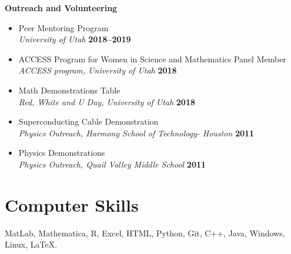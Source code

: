 \documentclass[margin,line]{res}
\begin{document}
\begin{resume}
{\bf Outreach and Volunteering}
\begin{itemize}
    \item[ ] Peer Mentoring Program
    \\ {\it University of Utah} \hfill {\bf 2018--2019}
    \item[ ] ACCESS Program for Women in Science and Mathematics Panel Member 
    \\ {\it ACCESS program, University of Utah} \hfill {\bf 2018}
    \item[ ] Math Demonstrations Table
    \\ {\it Red, White and U Day, University of Utah} \hfill {\bf 2018}
    \item[ ] Superconducting Cable Demonstration
    \\ {\it Physics Outreach, Harmony School of Technology- Houston} \hfill {\bf 2011}
    \item[ ] Physics Demonstrations
    \\ {\it Physics Outreach, Quail Valley Middle School} \hfill {\bf 2011}
\end{itemize}



\section{\sc Computer Skills} 
MatLab, Mathematica, R, Excel, HTML, Python, Git, C++, Java, Windows, Linux, \LaTeX.


\end{resume}
\end{document}
